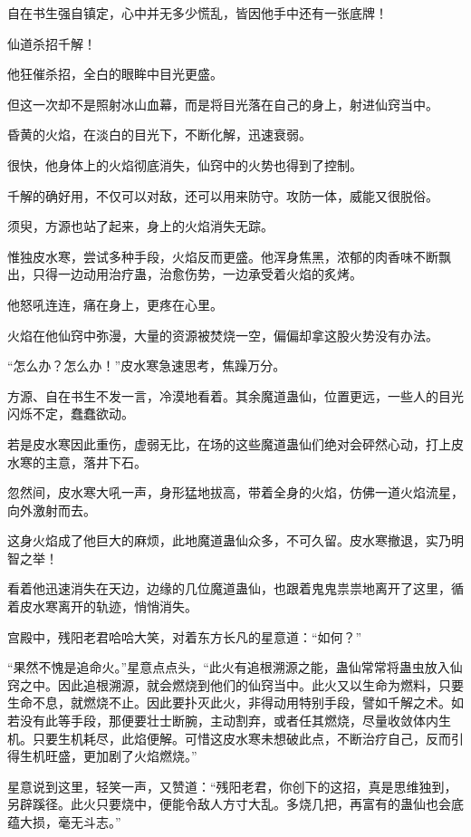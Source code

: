 \begin{this_body}
自在书生强自镇定，心中并无多少慌乱，皆因他手中还有一张底牌！

仙道杀招千解！

他狂催杀招，全白的眼眸中目光更盛。

但这一次却不是照射冰山血幕，而是将目光落在自己的身上，射进仙窍当中。

昏黄的火焰，在淡白的目光下，不断化解，迅速衰弱。

很快，他身体上的火焰彻底消失，仙窍中的火势也得到了控制。

千解的确好用，不仅可以对敌，还可以用来防守。攻防一体，威能又很脱俗。

须臾，方源也站了起来，身上的火焰消失无踪。

惟独皮水寒，尝试多种手段，火焰反而更盛。他浑身焦黑，浓郁的肉香味不断飘出，只得一边动用治疗蛊，治愈伤势，一边承受着火焰的炙烤。

他怒吼连连，痛在身上，更疼在心里。

火焰在他仙窍中弥漫，大量的资源被焚烧一空，偏偏却拿这股火势没有办法。

“怎么办？怎么办！”皮水寒急速思考，焦躁万分。

方源、自在书生不发一言，冷漠地看着。其余魔道蛊仙，位置更远，一些人的目光闪烁不定，蠢蠢欲动。

若是皮水寒因此重伤，虚弱无比，在场的这些魔道蛊仙们绝对会砰然心动，打上皮水寒的主意，落井下石。

忽然间，皮水寒大吼一声，身形猛地拔高，带着全身的火焰，仿佛一道火焰流星，向外激射而去。

这身火焰成了他巨大的麻烦，此地魔道蛊仙众多，不可久留。皮水寒撤退，实乃明智之举！

看着他迅速消失在天边，边缘的几位魔道蛊仙，也跟着鬼鬼祟祟地离开了这里，循着皮水寒离开的轨迹，悄悄消失。

宫殿中，残阳老君哈哈大笑，对着东方长凡的星意道：“如何？”

“果然不愧是追命火。”星意点点头，“此火有追根溯源之能，蛊仙常常将蛊虫放入仙窍之中。因此追根溯源，就会燃烧到他们的仙窍当中。此火又以生命为燃料，只要生命不息，就燃烧不止。因此要扑灭此火，非得动用特别手段，譬如千解之术。如若没有此等手段，那便要壮士断腕，主动割弃，或者任其燃烧，尽量收敛体内生机。只要生机耗尽，此焰便解。可惜这皮水寒未想破此点，不断治疗自己，反而引得生机旺盛，更加剧了火焰燃烧。”

星意说到这里，轻笑一声，又赞道：“残阳老君，你创下的这招，真是思维独到，另辟蹊径。此火只要烧中，便能令敌人方寸大乱。多烧几把，再富有的蛊仙也会底蕴大损，毫无斗志。”


\end{this_body}
